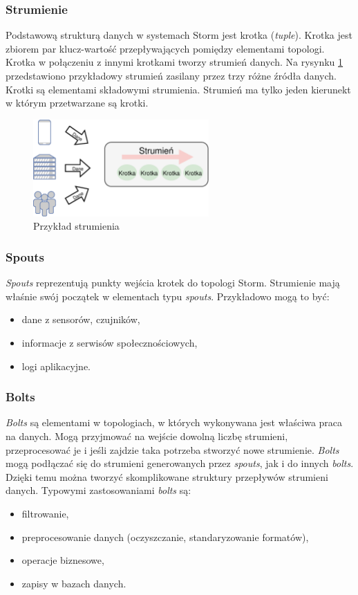 \subsubsection*{Strumienie}
Podstawową strukturą danych w systemach Storm jest krotka (\textit{tuple}).
Krotka jest zbiorem par klucz-wartość przepływających pomiędzy elementami topologi.
Krotka w połączeniu z innymi krotkami tworzy strumień danych.
Na rysynku \ref{fig:Stream} przedstawiono przykładowy strumień zasilany przez trzy różne źródła danych.
Krotki są elementami składowymi strumienia.
Strumień ma tylko jeden kierunekt w którym przetwarzane są krotki.
\begin{figure}[htbp]
  \centering
  \includegraphics[width=0.6\textwidth]{img/stream}
  \caption{Przykład strumienia}
  \label{fig:Stream}
\end{figure}
\subsubsection*{Spouts}
\textit{Spouts} reprezentują punkty wejścia krotek do topologi Storm.
Strumienie mają właśnie swój początek w elementach typu \textit{spouts}.
Przykładowo mogą to być:
\begin{itemize}
  \item dane z sensorów, czujników,
  \item informacje z serwisów społecznościowych,
  \item logi aplikacyjne.
\end{itemize}
\subsubsection*{Bolts}
\textit{Bolts} są elementami w topologiach,
w których wykonywana jest właściwa praca na danych.
Mogą przyjmować na wejście dowolną liczbę strumieni,
przeprocesować je
i jeśli zajdzie taka potrzeba stworzyć nowe strumienie.
\textit{Bolts} mogą podłączać się do strumieni generowanych przez \textit{spouts},
jak i do innych \textit{bolts}.
Dzięki temu można tworzyć skomplikowane struktury przepływów strumieni danych.
Typowymi zastosowaniami \textit{bolts} są:
\begin{itemize}
  \item filtrowanie,
  \item preprocesowanie danych (oczyszczanie, standaryzowanie formatów),
  \item operacje biznesowe,
  \item zapisy w bazach danych.
\end{itemize}


